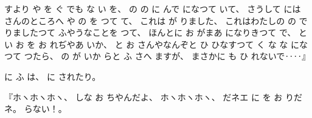 すより
や
を
ぐ
でも
な
い
を、
%
の
の
に
んで
になつて
いて、
%
さうして
には
さんのところへ
や
の
を
つて
て、
%
これは
が
りました、
%
これはわたしの
の
で
りましたつて
ふやうなことを
つて、
%
ほんとに
お
がまあ
になりきつて
で、
%
と
い
お
を
お
れぢやあ
いか、
%
と
お
さんやなんぞと
ひ
ひなすつて
く
な
な
になつて
つたら、
%
の
が
いか
らと
ふ
さへ
ますが、
%
まさかに
も
ひ
れないで‥‥』

%
に
ふ
は、
%
に
されたり。

%
『ホヽホヽホヽ、
%
しな
お
ちやんだよ、
%
ホヽホヽホヽ、
%
だネエ
に
を
お
りだネ。
%
らない！。

